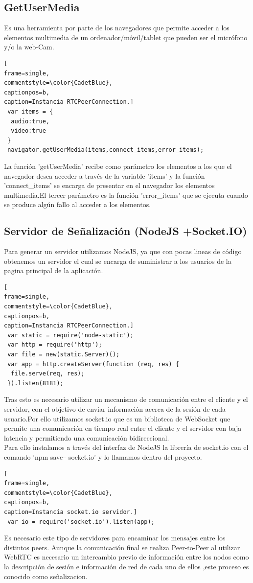 \subsection{GetUserMedia}
Es una herramienta por parte de los navegadores que permite acceder a los elementos multimedia de un ordenador/móvil/tablet que pueden ser el micrófono y/o la web-Cam.
\begin{lstlisting}[
frame=single,
commentstyle=\color{CadetBlue},
captionpos=b,
caption=Instancia RTCPeerConnection.]
 var items = {
  audio:true,
  video:true
 }
 navigator.getUserMedia(items,connect_items,error_items);
\end{lstlisting}
La función 'getUserMedia' recibe como parámetro los elementos a los que el navegador desea acceder a través de la variable 'items' y la función 'connect\_items' se encarga de presentar en el navegador los elementos multimedia.El tercer parámetro es la función 'error\_items' que se ejecuta cuando se produce algún fallo al acceder a los elementos.

\subsection{Servidor de Señalización (NodeJS +Socket.IO)}
Para generar un servidor utilizamos NodeJS, ya que con pocas lineas de código obtenemos un servidor el cual se encarga de suministrar a los usuarios de la pagina principal de la aplicación.
\begin{lstlisting}[
frame=single,
commentstyle=\color{CadetBlue},
captionpos=b,
caption=Instancia RTCPeerConnection.]
 var static = require('node-static');
 var http = require('http');
 var file = new(static.Server)();
 var app = http.createServer(function (req, res) {
  file.serve(req, res);
 }).listen(8181);
\end{lstlisting}
Tras esto es necesario utilizar un mecanismo de comunicación entre el cliente y el servidor, con el objetivo de enviar información acerca de la sesión de cada usuario.Por ello utilizamos socket.io que es un biblioteca de WebSocket que permite una comunicación en tiempo real entre el cliente y el servidor con baja latencia y permitiendo una comunicación bidireccional.
\\Para ello instalamos a través del interfaz de NodeJS la librería de socket.io con el comando 'npm save-- socket.io' y lo llamamos dentro del proyecto.
\begin{lstlisting}[
frame=single,
commentstyle=\color{CadetBlue},
captionpos=b,
caption=Instancia socket.io servidor.]
 var io = require('socket.io').listen(app);
\end{lstlisting}
Es necesario este tipo de servidores para encaminar los mensajes entre los distintos peers. Aunque la comunicación final se realiza Peer-to-Peer al utilizar WebRTC es necesario un intercambio previo de información entre los nodos como la descripción de sesión e información de red de cada uno de ellos ,este proceso es conocido como señalizacion.

